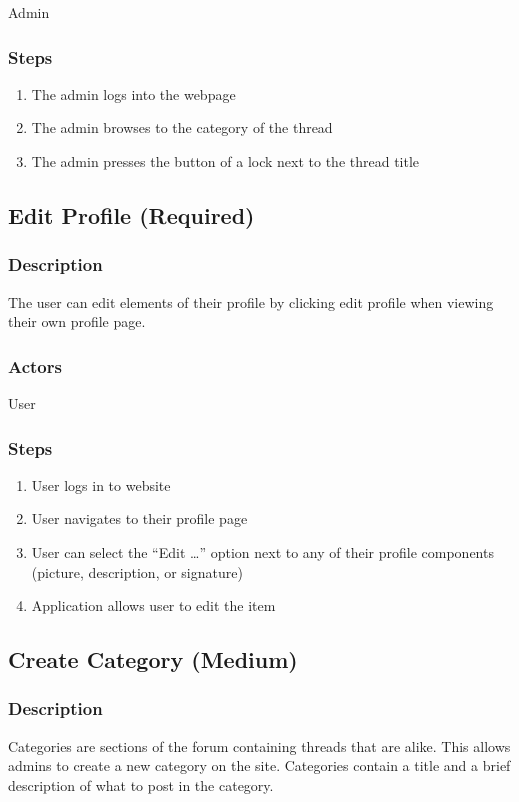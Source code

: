 \documentclass[12pt]{scrartcl}
\begin{document}
Admin
\subsubsection{Steps}

\begin{enumerate}
\item The admin logs into the webpage
\item The admin browses to the category of the thread 
\item The admin presses the button of a lock next to the thread title
\end{enumerate}


\subsection{Edit Profile (Required)}
\subsubsection{Description}
The user can edit elements of their profile by clicking edit profile when viewing their own profile page.

\subsubsection{Actors}
User

\subsubsection{Steps}
\begin {enumerate}
\item User logs in to website
\item User navigates to their profile page
\item User can select the “Edit …” option next to any of their profile components (picture, description, or signature)
\item Application allows user to edit the item
\end {enumerate}


\subsection{Create Category (Medium)}
\subsubsection{Description}
Categories are sections of the forum containing threads that are alike.
This allows admins to create a new category on the site. Categories contain a title and a brief description of what to post in the category.
\end{document}
